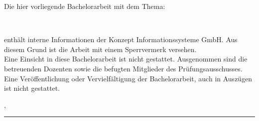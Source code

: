 \thispagestyle{empty}
\vspace*{2em}

Die hier vorliegende Bachelorarbeit mit dem Thema: \\
\begin{center}
	\large\bf\myTopic\\
\end{center}
\vspace*{2em}
enthält interne Informationen der Konzept Informationssysteme GmbH. Aus diesem Grund ist die Arbeit mit einem Sperrvermerk versehen.\\\newline
\noindent Eine Einsicht in diese Bachelorarbeit ist nicht gestattet. Ausgenommen sind die betreuenden Dozenten sowie die befugten Mitglieder des Prüfungsausschusses. Eine Veröffentlichung oder Vervielfältigung der Bachelorarbeit, auch in Auszügen ist nicht gestattet.

\vspace{4em}

\noindent \myEndPlace, \myEndDate
\vspace{4em}

\noindent\rule{6cm}{0.4pt}\\
\myAutor

\newpage